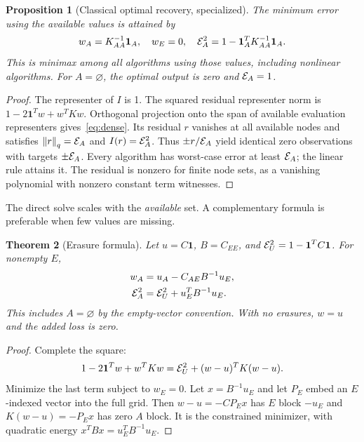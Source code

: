 \documentclass[11pt]{article}
\newtheorem{theorem}{Theorem}
\newtheorem{proposition}[theorem]{Proposition}
\newcommand{\one}{\boldsymbol 1}\newcommand{\norm}[1]{\left\lVert#1\right\rVert}
\begin{document}
\begin{proposition}[Classical optimal recovery, specialized]\label{prop:optimal}
The minimum error using the available values is attained by
\begin{equation}
w_A=K_{AA}^{-1}\one_A,\quad w_E=0,\quad
\E_A^2=1-\one_A^TK_{AA}^{-1}\one_A.
\label{eq:dense}
\end{equation}
This is minimax among all algorithms using those values, including nonlinear algorithms. For $A=\varnothing$, the optimal output is zero and $\mathcal E_A=1$.
\end{proposition}
\begin{proof}
The representer of $I$ is 1. The squared residual representer norm is $1-2\one^Tw+w^TKw$. Orthogonal projection onto the span of available evaluation representers gives~\eqref{eq:dense}. Its residual $r$ vanishes at all available nodes and satisfies $\norm r_q=\E_A$ and $I(r)=\mathcal E_A^2$. Thus $\pm r/\mathcal E_A$ yield identical zero observations with targets $\pm\mathcal E_A$. Every algorithm has worst-case error at least $\mathcal E_A$; the linear rule attains it. The residual is nonzero for finite node sets, as a vanishing polynomial with nonzero constant term witnesses.
\end{proof}

The direct solve scales with the \emph{available} set. A complementary formula is preferable when few values are missing.

\begin{theorem}[Erasure formula]\label{thm:erasure}
Let $u=C\one$, $B=C_{EE}$, and $\E_U^2=1-\one^TC\one$. For nonempty $E$,
\begin{align}
w_A&=u_A-C_{AE}B^{-1}u_E,\label{eq:weights}\\
\mathcal E_A^2&=\mathcal E_U^2+u_E^TB^{-1}u_E.\label{eq:loss}
\end{align}
This includes $A=\varnothing$ by the empty-vector convention. With no erasures, $w=u$ and the added loss is zero.
\end{theorem}
\begin{proof}
Complete the square:
\[
1-2\one^Tw+w^TKw=\E_U^2+(w-u)^TK(w-u).
\]
Minimize the last term subject to $w_E=0$. Let $x=B^{-1}u_E$ and let $P_E$ embed an $E$-indexed vector into the full grid. Then $w-u=-CP_Ex$ has $E$ block $-u_E$ and $K(w-u)=-P_Ex$ has zero $A$ block. It is the constrained minimizer, with quadratic energy $x^TBx=u_E^TB^{-1}u_E$.
\end{proof}
\end{document}
